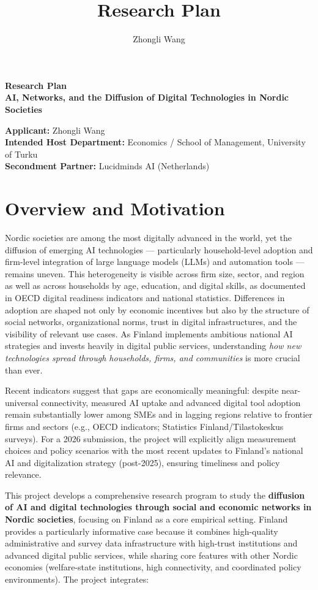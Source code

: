 \documentclass{nfr}
\title{Research Plan}
\author{Zhongli Wang}
\begin{document}
\begin{center}
{\Large \textbf{Research Plan}}\\[0.6cm]

{\large \textbf{AI, Networks, and the Diffusion of Digital Technologies in Nordic Societies}}\\[0.4cm]
\end{center}

\noindent \textbf{Applicant:} Zhongli Wang\\
\textbf{Intended Host Department:} Economics / School of Management, University of Turku\\
\textbf{Secondment Partner:} Lucidminds AI (Netherlands)\\[0.6cm]

\section{Overview and Motivation}

Nordic societies are among the most digitally advanced in the world, yet the diffusion of emerging AI technologies — particularly household-level adoption and firm-level integration of large language models (LLMs) and automation tools — remains uneven. This heterogeneity is visible across firm size, sector, and region as well as across households by age, education, and digital skills, as documented in OECD digital readiness indicators and national statistics. Differences in adoption are shaped not only by economic incentives but also by the structure of social networks, organizational norms, trust in digital infrastructures, and the visibility of relevant use cases. As Finland implements ambitious national AI strategies and invests heavily in digital public services, understanding \emph{how new technologies spread through households, firms, and communities} is more crucial than ever.

Recent indicators suggest that gaps are economically meaningful: despite near-universal connectivity, measured AI uptake and advanced digital tool adoption remain substantially lower among SMEs and in lagging regions relative to frontier firms and sectors (e.g., OECD indicators; Statistics Finland/Tilastokeskus surveys). For a 2026 submission, the project will explicitly align measurement choices and policy scenarios with the most recent updates to Finland’s national AI and digitalization strategy (post-2025), ensuring timeliness and policy relevance.

This project develops a comprehensive research program to study the \textbf{diffusion of AI and digital technologies through social and economic networks in Nordic societies}, focusing on Finland as a core empirical setting. Finland provides a particularly informative case because it combines high-quality administrative and survey data infrastructure with high-trust institutions and advanced digital public services, while sharing core features with other Nordic economies (welfare-state institutions, high connectivity, and coordinated policy environments). The project integrates:
\end{document}
